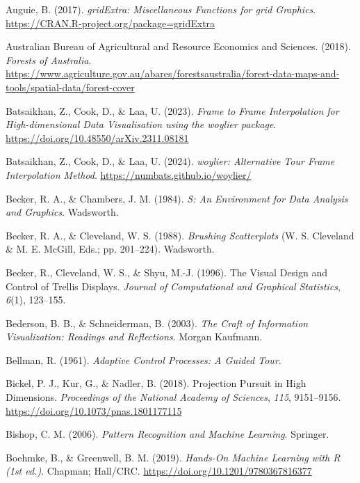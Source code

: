 \documentclass[
  letterpaper,
]{krantz}
\newlength{\cslhangindent}
\newenvironment{CSLReferences}[2] %
 {\begin{list}{}{%
  \setlength{\itemindent}{0pt}
  \setlength{\leftmargin}{0pt}
  \setlength{\parsep}{0pt}
  \ifodd #1
   \setlength{\leftmargin}{\cslhangindent}
   \setlength{\itemindent}{-1\cslhangindent}
  \fi
  \setlength{\itemsep}{#2\baselineskip}}}
 {\end{list}}
\begin{document}
\begin{CSLReferences}{1}{0}
Auguie, B. (2017). \emph{{gridExtra}: {M}iscellaneous {F}unctions for
{grid} {G}raphics}. \url{https://CRAN.R-project.org/package=gridExtra}

Australian Bureau of Agricultural and Resource Economics and Sciences.
(2018). \emph{{Forests of Australia}}.
\url{https://www.agriculture.gov.au/abares/forestsaustralia/forest-data-maps-and-tools/spatial-data/forest-cover}

Batsaikhan, Z., Cook, D., \& Laa, U. (2023). \emph{Frame to {F}rame
{I}nterpolation for {H}igh-dimensional {D}ata {V}isualisation using the
{woylier} package}. \url{https://doi.org/10.48550/arXiv.2311.08181}

Batsaikhan, Z., Cook, D., \& Laa, U. (2024). \emph{{woylier}:
{A}lternative {T}our {F}rame {I}nterpolation {M}ethod}.
\url{https://numbats.github.io/woylier/}

Becker, R. A., \& Chambers, J. M. (1984). \emph{{S}: {A}n {E}nvironment
for {D}ata {A}nalysis and {G}raphics}. Wadsworth.

Becker, R. A., \& Cleveland, W. S. (1988). \emph{{B}rushing
{S}catterplots} (W. S. Cleveland \& M. E. McGill, Eds.; pp. 201--224).
Wadsworth.

Becker, R., Cleveland, W. S., \& Shyu, M.-J. (1996). {T}he {V}isual
{D}esign and {C}ontrol of {T}rellis {D}isplays. \emph{Journal of
Computational and Graphical Statistics}, \emph{6}(1), 123--155.

Bederson, B. B., \& Schneiderman, B. (2003). \emph{The {C}raft of
{I}nformation {V}isualization: {R}eadings and {R}eflections}. Morgan
Kaufmann.

Bellman, R. (1961). \emph{Adaptive {C}ontrol {P}rocesses: {A} {G}uided
{T}our}.

Bickel, P. J., Kur, G., \& Nadler, B. (2018). Projection {P}ursuit in
{H}igh {D}imensions. \emph{Proceedings of the National Academy of
Sciences}, \emph{115}, 9151--9156.
\url{https://doi.org/10.1073/pnas.1801177115}

Bishop, C. M. (2006). \emph{Pattern {R}ecognition and {M}achine
{L}earning}. Springer.

Boehmke, B., \& Greenwell, B. M. (2019). \emph{Hands-{O}n {M}achine
{L}earning with {R} (1st ed.)}. Chapman; Hall/CRC.
\url{https://doi.org/10.1201/9780367816377}


\end{CSLReferences}
\end{document}
